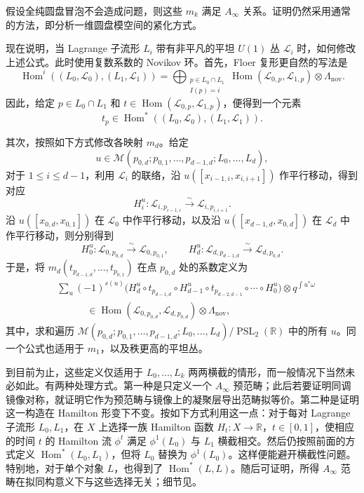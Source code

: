 假设全纯圆盘冒泡不会造成问题，则这些 $m_k$ 满足 $A_\infty$ 关系。证明仍然采用通常的方法，即分析一维圆盘模空间的紧化方式。

现在说明，当 Lagrange 子流形 $L_i$ 带有非平凡的平坦 $U(1)$ 丛 $\mathcal L_i$ 时，如何修改上述公式。此时使用复数系数的 Novikov 环。首先，Floer 复形更自然的写法是
\[
\operatorname{Hom}^i((L_0,\mathcal L_0),(L_1,\mathcal L_1))
=\bigoplus_{\substack{p\in L_0\cap L_1\\I(p)=i}}
\operatorname{Hom}(\mathcal L_{0,p},\mathcal L_{1,p})\otimes\Lambda_{\mathrm{nov}}.
\]
因此，给定 $p\in L_0\cap L_1$ 和 $t\in\operatorname{Hom}(\mathcal L_{0,p},\mathcal L_{1,p})$，便得到一个元素
\[
t_p\in\operatorname{Hom}^*((L_0,\mathcal L_0),(L_1,\mathcal L_1)).
\]

其次，按照如下方式修改各映射 $m_d$。给定
\[
u\in\mathcal M(p_{0,d};p_{0,1},\ldots,p_{d-1,d};L_0,\ldots,L_d),
\]
对于 $1\leq i\leq d-1$，利用 $\mathcal L_i$ 的联络，沿 $u([x_{i-1,i},x_{i,i+1}])$ 作平行移动，得到对应
\[
H_i^u\colon\mathcal L_{i,p_{i-1,i}}\xrightarrow{\sim}\mathcal L_{i,p_{i,i+1}}.
\]
沿 $u([x_{0,d},x_{0,1}])$ 在 $\mathcal L_0$ 中作平行移动，以及沿 $u([x_{d-1,d},x_{0,d}])$ 在 $\mathcal L_d$ 中作平行移动，则分别得到
\[
H_0^u\colon\mathcal L_{0,p_{0,d}}\xrightarrow{\sim}\mathcal L_{0,p_{0,1}},
\qquad
H_d^u\colon\mathcal L_{d,p_{d-1,d}}\xrightarrow{\sim}\mathcal L_{d,p_{0,d}}.
\]
于是，将 $m_d(t_{p_{d-1,d}},\ldots,t_{p_{0,1}})$ 在点 $p_{0,d}$ 处的系数定义为
\[
\begin{aligned}
&\sum_u(-1)^{s(u)}
\bigl(H_d^u\circ t_{p_{d-1,d}}\circ H_{d-1}^u\circ
t_{p_{d-2,d-1}}\circ\cdots\circ H_0^u\bigr)
\otimes q^{\int u^*\omega}\\
&\hspace{3em}\in\operatorname{Hom}(\mathcal L_{0,p_{0,d}},\mathcal L_{d,p_{0,d}})
\otimes\Lambda_{\mathrm{nov}},
\end{aligned}
\]
其中，求和遍历 $\mathcal M(p_{0,d};p_{0,1},\ldots,p_{d-1,d};L_0,\ldots,L_d)
/\operatorname{PSL}_2(\mathbb R)$ 中的所有 $u$。同一个公式也适用于 $m_1$，以及秩更高的平坦丛。

到目前为止，这些定义仅适用于 $L_0,\ldots,L_k$ 两两横截的情形，而一般情况下当然未必如此。有两种处理方式。第一种是只定义一个 $A_\infty$ 预范畴；此后若要证明同调镜像对称，就证明它作为预范畴与镜像上的凝聚层导出范畴拟等价。第二种是证明这一构造在 Hamilton 形变下不变。按如下方式利用这一点：对于每对 Lagrange 子流形 $L_0,L_1$，在 $X$ 上选择一族 Hamilton 函数 $H_t\colon X\to\mathbb R$，$t\in[0,1]$，使相应的时间 $t$ 的 Hamilton 流 $\phi^t$ 满足 $\phi^1(L_0)$ 与 $L_1$ 横截相交。然后仍按照前面的方式定义 $\operatorname{Hom}^*(L_0,L_1)$，但将 $L_0$ 替换为 $\phi^1(L_0)$。这样便能避开横截性问题。特别地，对于单个对象 $L$，也得到了 $\operatorname{Hom}^*(L,L)$。随后可证明，所得 $A_\infty$ 范畴在拟同构意义下与这些选择无关；细节见。

